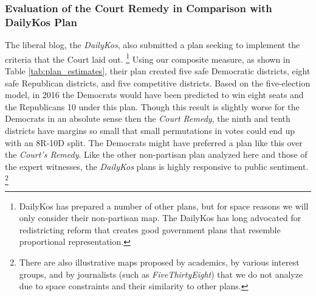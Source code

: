 \subsubsection*{Evaluation of the Court Remedy in Comparison with DailyKos Plan}
%
The liberal blog, the \textit{DailyKos}, also submitted a plan seeking to implement the criteria that the Court laid out.
        \footnote{DailyKos has prepared a number of other plans, but for space reasons we will only consider their non-partisan map. The DailyKos has long advocated for redistricting reform that creates good government plans that resemble proportional representation.}
Using our composite measure, as shown in Table \ref{tab:plan_estimates}, their plan created five safe Democratic districts, eight safe Republican districts, and five competitive districts. Based on the five-election model, in 2016 the Democrats would have been predicted to win eight seats and the Republicans 10 under this plan. Though this result is slightly worse for the Democrats in an absolute sense then the \textit{Court Remedy}, the ninth and tenth districts have margins so small that small permutations in votes could end up with an 8R-10D split. The Democrats might have preferred a plan like this over the \textit{Court's Remedy}. Like the other non-partisan plan analyzed here and those of the expert witnesses, the \textit{DailyKos} plans is highly responsive to public sentiment.
        \footnote{There are also illustrative maps proposed by academics, by various interest groups, and by journalists (such as \textit{FiveThirtyEight}) that we do not analyze due to space constraints and their similarity to other plans.}
%
%
%
